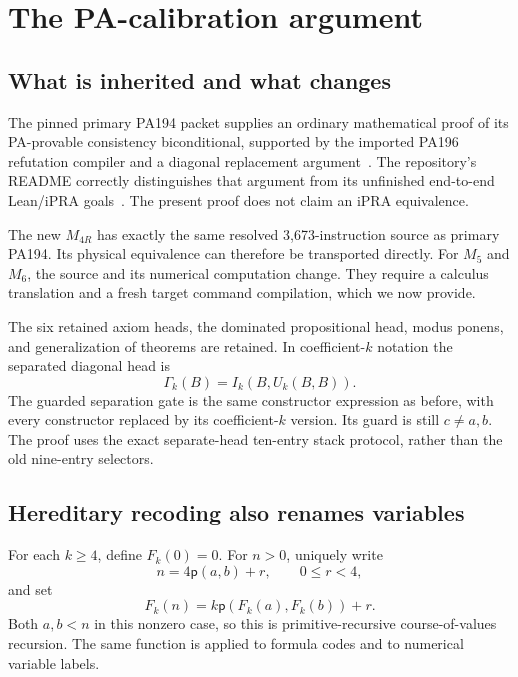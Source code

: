 \documentclass[10pt,letterpaper]{article}
\newcommand{\pair}{\mathsf p}
\begin{document}
\section{The PA-calibration argument}
\label{sec:logic}

\subsection{What is inherited and what changes}

The pinned primary PA194 packet supplies an ordinary mathematical proof of its PA-provable consistency biconditional, supported by the imported PA196 refutation compiler and a diagonal replacement argument~\cite{primary,upstream}. The repository's README correctly distinguishes that argument from its unfinished end-to-end Lean/iPRA goals~\cite{pareadme}. The present proof does not claim an iPRA equivalence.

The new $M_{4R}$ has exactly the same resolved 3,673-instruction source as primary PA194. Its physical equivalence can therefore be transported directly. For $M_5$ and $M_6$, the source and its numerical computation change. They require a calculus translation and a fresh target command compilation, which we now provide.

The six retained axiom heads, the dominated propositional head, modus ponens, and generalization of theorems are retained. In coefficient-$k$ notation the separated diagonal head is
\[
 \Gamma_k(B)=I_k(B,U_k(B,B)).
\]
The guarded separation gate is the same constructor expression as before, with every constructor replaced by its coefficient-$k$ version. Its guard is still $c\ne a,b$. The proof uses the exact separate-head ten-entry stack protocol, rather than the old nine-entry selectors.

\subsection{Hereditary recoding also renames variables}

For each $k\ge4$, define $F_k(0)=0$. For $n>0$, uniquely write
\[
 n=4\pair(a,b)+r,\qquad 0\le r<4,
\]
and set
\[
 F_k(n)=k\pair(F_k(a),F_k(b))+r.                 \tag{1}
\]
Both $a,b<n$ in this nonzero case, so this is primitive-recursive course-of-values recursion. The same function is applied to formula codes and to numerical variable labels.
\end{document}
